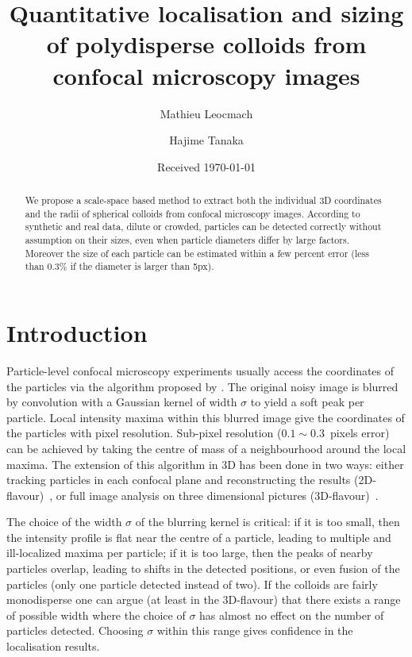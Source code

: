 

\DeclareMathOperator{\erf}{erf}


\title{Quantitative localisation and sizing of polydisperse colloids from confocal microscopy images}



\author{Mathieu Leocmach} 

\author{Hajime Tanaka}

\date{Received \today}

\begin{abstract}
We propose a scale-space based method to extract both the individual 3D coordinates and the radii of spherical colloids from confocal microscopy images. According to synthetic and real data, dilute or crowded, particles can be detected correctly without assumption on their sizes, even when particle diameters differ by large factors. Moreover the size of each particle can be estimated within a few percent error (less than $0.3\%$ if the diameter is larger than \unit{5}{px}).
\end{abstract}
\maketitle

\section*{Introduction}
Particle-level confocal microscopy experiments usually access the coordinates of the particles via the algorithm proposed by \citet{Crocker1996}. The original noisy image is blurred by convolution with a Gaussian kernel of width $\sigma$ to yield a soft peak per particle. Local intensity maxima within this blurred image give the coordinates of the particles with pixel resolution. Sub-pixel resolution ($0.1\sim0.3$~pixels error) can be achieved by taking the centre of mass of a neighbourhood around the local maxima. The extension of this algorithm in 3D has been done in two ways: either tracking particles in each confocal plane and reconstructing the results (2D-flavour)~\citep{dinsmore2001tdc}, or full image analysis on three dimensional pictures (3D-flavour)~\citep{vanblaaderen1995rss, Lu2007}.

The choice of the width $\sigma$ of the blurring kernel is critical: if it is too small, then the intensity profile is flat near the centre  of a particle, leading to multiple and ill-localized maxima per particle; if it is too large, then the peaks of nearby particles overlap, leading to shifts in the detected positions, or even fusion of the particles (only one particle detected instead of two). If the colloids are fairly monodisperse one can argue (at least in the 3D-flavour) that there exists a range of possible width where the choice of $\sigma$ has almost no effect on the number of particles detected. Choosing $\sigma$ within this range gives confidence in the localisation results.

